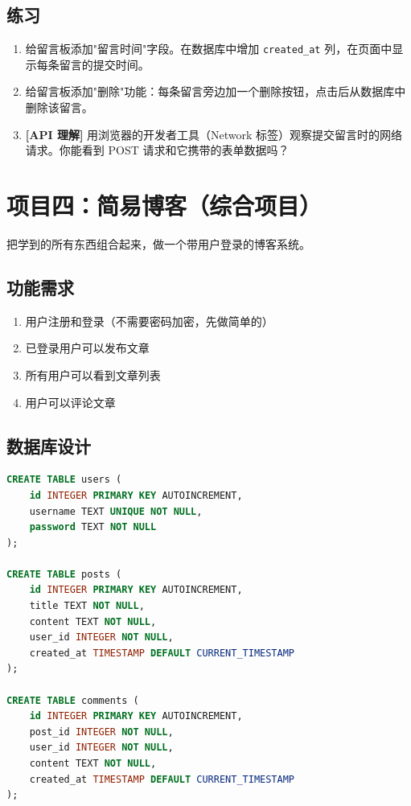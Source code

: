 \documentclass[a4paper,12pt]{ctexart}
\begin{document}
\subsection*{练习}

\begin{enumerate}
  \item 给留言板添加"留言时间"字段。在数据库中增加 \texttt{created\_at} 列，在页面中显示每条留言的提交时间。
  \item 给留言板添加"删除"功能：每条留言旁边加一个删除按钮，点击后从数据库中删除该留言。
  \item \textbf{[API 理解]} 用浏览器的开发者工具（Network 标签）观察提交留言时的网络请求。你能看到 POST 请求和它携带的表单数据吗？
\end{enumerate}

\section*{项目四：简易博客（综合项目）}

把学到的所有东西组合起来，做一个带用户登录的博客系统。

\subsection*{功能需求}

\begin{enumerate}
  \item 用户注册和登录（不需要密码加密，先做简单的）
  \item 已登录用户可以发布文章
  \item 所有用户可以看到文章列表
  \item 用户可以评论文章
\end{enumerate}

\subsection*{数据库设计}

\begin{lstlisting}[language=SQL]
CREATE TABLE users (
    id INTEGER PRIMARY KEY AUTOINCREMENT,
    username TEXT UNIQUE NOT NULL,
    password TEXT NOT NULL
);

CREATE TABLE posts (
    id INTEGER PRIMARY KEY AUTOINCREMENT,
    title TEXT NOT NULL,
    content TEXT NOT NULL,
    user_id INTEGER NOT NULL,
    created_at TIMESTAMP DEFAULT CURRENT_TIMESTAMP
);

CREATE TABLE comments (
    id INTEGER PRIMARY KEY AUTOINCREMENT,
    post_id INTEGER NOT NULL,
    user_id INTEGER NOT NULL,
    content TEXT NOT NULL,
    created_at TIMESTAMP DEFAULT CURRENT_TIMESTAMP
);
\end{lstlisting}
\end{document}

